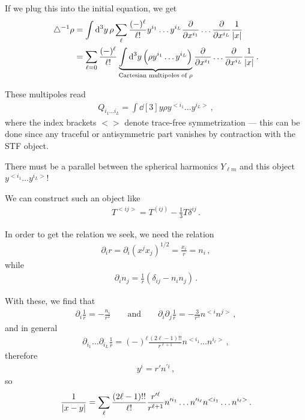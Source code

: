 \documentclass[main.tex]{subfiles}
\begin{document}
If we plug this into the initial equation, we get 
%
\begin{align}
\triangle^{-1} \rho &= 
\int \dd[3]{y} \rho 
\sum _{\ell} \frac{(-)^{\ell}}{\ell!} 
y^{i_1} \dots y^{i_L}\pdv{x^{i_1}} \dots
\pdv{x^{i_L}} \frac{1}{\abs{x}}  \\
&= 
\sum _{\ell=0} \frac{(-)^{\ell}}{\ell!}
\underbrace{\int \dd[3]{y} \qty( \rho y^{i_1} \dots y^{i_L})}_{\text{Cartesian multipoles of \(\rho \)}}
\pdv{x^{i_1}} \dots \pdv{x^{i_L}} \frac{1}{\abs{x}}
\,.
\end{align}

These multipoles read 
%
\begin{align}
Q_{i_1 \dots i_L} = \int \dd[3]{y} \rho y^{<i_1} \dots y^{i_L>}
\,,
\end{align}
%
where the index brackets \(<>\) denote trace-free symmetrization --- this can be done since any traceful or antisymmetric part vanishes by contraction with the STF object. 

There must be a parallel between the spherical harmonics \(Y_{\ell m}\) and this object \(y^{<i_1} \dots y^{i_L>}\)! 

We can construct such an object like 
%
\begin{align}
T^{<ij>} = T^{(ij)} - \frac{1}{3} T \delta^{ij}
\,.
\end{align}

In order to get the relation we seek, we need the relation 
%
\begin{align}
\partial_{i} r = \partial_{i} (x^{j} x_j)^{1/2} 
= \frac{x_{i}}{r} = n_i
\,,
\end{align}
%
while 
%
\begin{align}
\partial_i n_j = \frac{1}{r} (\delta_{ij} - n_i n_j)
\,.
\end{align}

With these, we find that 
%
\begin{align}
\partial_{i} \frac{1}{r} = - \frac{n_i}{r^2}
\qquad \text{and} \qquad
\partial_{i} \partial_{j} \frac{1}{r} = - \frac{3}{r^3} n^{<i} n^{j>}
\,,
\end{align}
%
and in general 
%
\begin{align}
\partial_{i_1} \dots \partial_{i_L} \frac{1}{r} 
= (-)^{\ell} \frac{(2 \ell -1)!!}{r^{\ell+1}} n^{<i_1} \dots n^{i_\ell>}
\,,
\end{align}
%
therefore 
%
\begin{align}
y^{i} = r' n^{\prime i}
\,,
\end{align}
%
so 
%
\begin{align}
\frac{1}{\abs{x-y}} = \sum _{\ell} \frac{(2 \ell - 1)!!}{\ell!} \frac{r^{\prime \ell}}{r^{\ell + 1}} n^{\prime i_1} \dots n^{\prime i_\ell}
n^{<i_1} \dots n^{i_\ell>}
\,.
\end{align}
\end{document}
